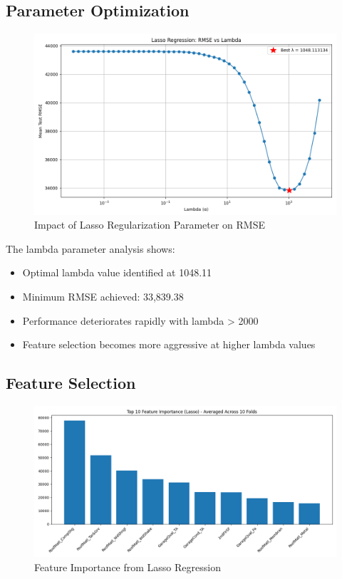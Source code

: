 \subsection{Parameter Optimization}
\begin{figure}[H]
    \centering
    \includegraphics[width=1.0\textwidth]{../lasso_lambda_vs_rmse.png}
    \caption{Impact of Lasso Regularization Parameter on RMSE}
    \label{fig:lasso_lambda}
\end{figure}

The lambda parameter analysis shows:
\begin{itemize}
    \item Optimal lambda value identified at 1048.11
    \item Minimum RMSE achieved: 33,839.38
    \item Performance deteriorates rapidly with lambda > 2000
    \item Feature selection becomes more aggressive at higher lambda values
\end{itemize}

\subsection{Feature Selection}
\begin{figure}[H]
    \centering
    \includegraphics[width=1.0\textwidth]{../lasso_feature_importance.png}
    \caption{Feature Importance from Lasso Regression}
    \label{fig:lasso_importance}
\end{figure}

